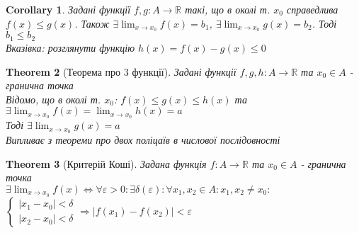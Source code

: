 \documentclass[a4paper, 14pt]{extarticle}
\def\huge{\displaystyle}
\theoremstyle{theoremdd}
\newtheorem{theorem}{Theorem}[subsection]
\theoremstyle{theoremdd}
\theoremstyle{theoremdd}
\theoremstyle{theoremdd}
\theoremstyle{theoremdd}
\theoremstyle{theoremdd}
\theoremstyle{theoremdd}
\theoremstyle{theoremdd}
\newtheorem{corollary}[theorem]{Corollary}
\begin{document}
\begin{corollary}
Задані функції $f,g: A \to \mathbb{R}$ такі, що в околі т. $x_0$ справедлива $f(x) \leq g(x)$. Також $\exists \huge \lim_{x \to x_0} f(x) = b_1$, $\exists \huge \lim_{x \to x_0} g(x) = b_2$. Тоді $b_1 \leq b_2$\\
\textit{Вказівка: розглянути функцію} $h(x) = f(x) - g(x) \leq 0$
\end{corollary}

\begin{theorem}[Теорема про 3 функції]
Задані функції $f,g,h: A \to \mathbb{R}$ та $x_0 \in A$ - гранична точка\\
Відомо, що в околі т. $x_0$: $f(x) \leq g(x) \leq h(x)$ та \\ $\exists \huge \lim_{x \to x_0} f(x) = \lim_{x \to x_0} h(x) = a$\\
Тоді $\exists \huge \lim_{x \to x_0} g(x) = a$\\
\textit{Випливає з теореми про двох поліцаїв в числової послідовності}
\end{theorem}

\begin{theorem}[Критерій Коші]
Задана функція $f: A \to \mathbb{R}$ та $x_0 \in A$ - гранична точка\\
$\exists \huge \lim_{x \to x_0} f(x) \iff \forall \varepsilon > 0: \exists \delta(\varepsilon): \forall x_1,x_2 \in A: x_1,x_2 \neq x_0:$\\
$\begin{cases} |x_1-x_0|<\delta \\ |x_2-x_0|<\delta \end{cases} \Rightarrow |f(x_1)-f(x_2)|<\varepsilon
$
\end{theorem}
\end{document}
